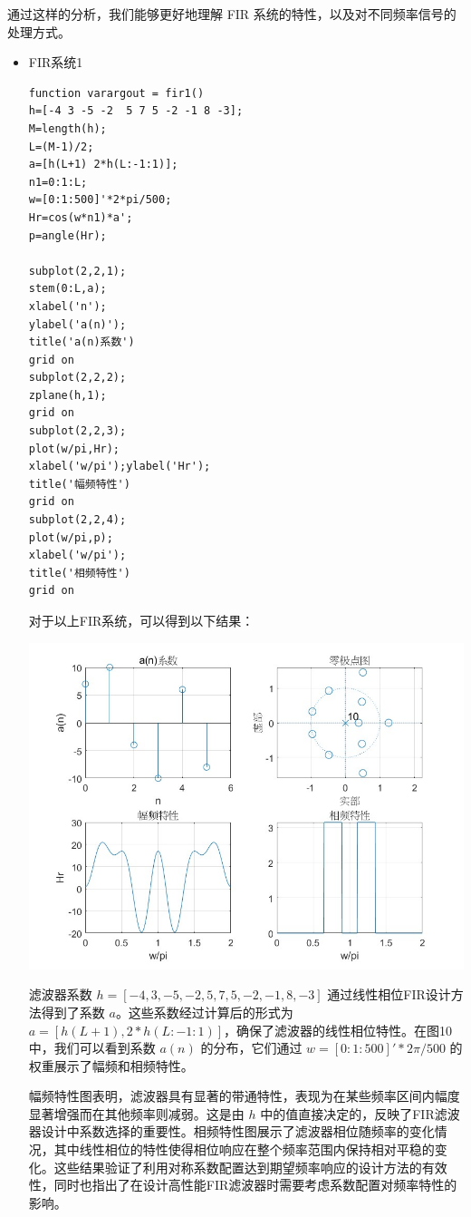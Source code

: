 \documentclass[a4paper,12pt]{article}
\begin{document}
通过这样的分析，我们能够更好地理解 FIR 系统的特性，以及对不同频率信号的处理方式。

\begin{itemize}
    \item FIR系统1

    \begin{lstlisting}
function varargout = fir1()
h=[-4 3 -5 -2  5 7 5 -2 -1 8 -3];
M=length(h);
L=(M-1)/2;
a=[h(L+1) 2*h(L:-1:1)];
n1=0:1:L;
w=[0:1:500]'*2*pi/500;
Hr=cos(w*n1)*a';
p=angle(Hr);

subplot(2,2,1);
stem(0:L,a); 
xlabel('n');
ylabel('a(n)');
title('a(n)系数')
grid on
subplot(2,2,2);
zplane(h,1);
grid on
subplot(2,2,3); 
plot(w/pi,Hr);
xlabel('w/pi');ylabel('Hr');
title('幅频特性')
grid on
subplot(2,2,4);
plot(w/pi,p); 
xlabel('w/pi');
title('相频特性')
grid on

    \end{lstlisting}

对于以上FIR系统，可以得到以下结果：

\centering 
\includegraphics[width=0.8\linewidth]{images/3_Verify/fir1.jpg}
\justifying

滤波器系数 \( h=[-4, 3, -5, -2, 5, 7, 5, -2, -1, 8, -3] \) 通过线性相位FIR设计方法得到了系数 \( a \)。这些系数经过计算后的形式为 \( a=[h(L+1), 2*h(L:-1:1)] \)，确保了滤波器的线性相位特性。在图10中，我们可以看到系数 \( a(n) \) 的分布，它们通过 \( w=[0:1:500]'*2\pi/500 \) 的权重展示了幅频和相频特性。

幅频特性图表明，滤波器具有显著的带通特性，表现为在某些频率区间内幅度显著增强而在其他频率则减弱。这是由 \( h \) 中的值直接决定的，反映了FIR滤波器设计中系数选择的重要性。相频特性图展示了滤波器相位随频率的变化情况，其中线性相位的特性使得相位响应在整个频率范围内保持相对平稳的变化。这些结果验证了利用对称系数配置达到期望频率响应的设计方法的有效性，同时也指出了在设计高性能FIR滤波器时需要考虑系数配置对频率特性的影响。


\end{itemize}
\end{document}
